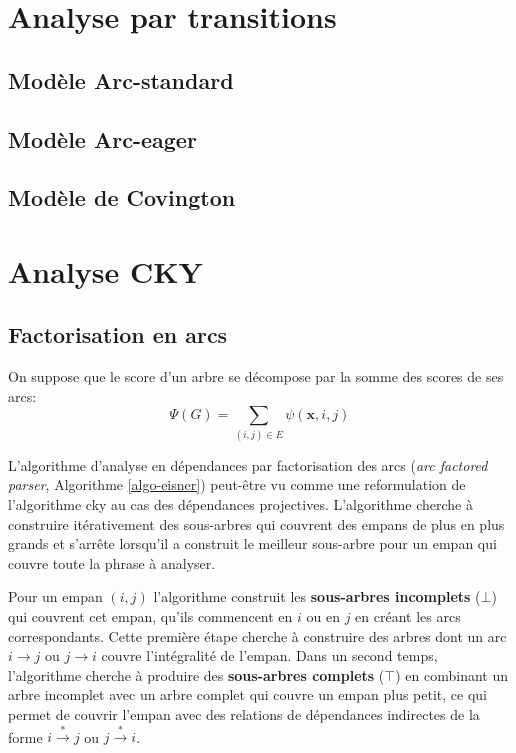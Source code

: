 \documentclass[11pt,openany]{book}
\begin{document}
\section{Analyse par transitions}
\subsection{Modèle Arc-standard}
\subsection{Modèle Arc-eager}
\subsection{Modèle de Covington}

\section{Analyse CKY}
\subsection{Factorisation en arcs}
On suppose que le score d'un arbre se décompose par la somme des scores de ses arcs:
\begin{displaymath}
\Psi(G) = \sum_{(i,j) \in E} \psi(\mathbf{x},i,j)
\end{displaymath}

L'algorithme d'analyse en dépendances par factorisation des arcs ({\em arc factored parser}, Algorithme \ref{algo-eisner})
peut-être vu comme une reformulation de l'algorithme {\sc cky} au cas des dépendances projectives.
L'algorithme cherche à construire itérativement des sous-arbres qui couvrent des empans de plus en plus grands
et s'arrête lorsqu'il a construit le meilleur sous-arbre pour  un empan qui couvre toute la phrase à analyser.

Pour un empan $(i,j)$ l'algorithme construit les {\bf sous-arbres incomplets} ($\bot$) qui couvrent cet empan, qu'ils commencent en $i$ ou en $j$
en créant les arcs correspondants. Cette première étape cherche à construire des arbres dont un arc $i\rightarrow j$ ou $j\rightarrow i$
couvre l'intégralité de l'empan. Dans un second temps, l'algorithme cherche à produire des {\bf sous-arbres complets} ($\top$) en combinant
 un arbre incomplet avec un arbre complet qui couvre un empan plus petit, ce qui permet de couvrir l'empan avec des relations de dépendances indirectes de la forme $i\stackrel{*}{\rightarrow} j$ ou
$j\stackrel{*}{\rightarrow} i$.
\end{document}

